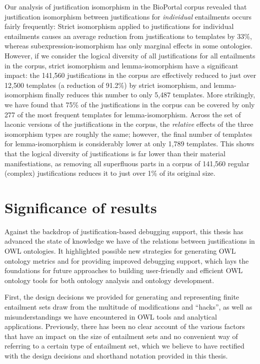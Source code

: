 Our analysis of justification isomorphism in the BioPortal corpus revealed that justification isomorphism between justifications for \emph{individual} entailments occurs fairly frequently: Strict isomorphism applied to justifications for individual entailments causes an average reduction from justifications to templates by 33\%, whereas subexpression-isomorphism has only marginal effects in some ontologies. However, if we consider the logical diversity of all justifications for all entailments in the corpus, strict isomorphism and lemma-isomorphism have a significant impact: the 141,560 justifications in the corpus are effectively reduced to just over 12,500 templates (a reduction of 91.2\%) by strict isomorphism, and lemma-isomorphism finally reduces this number to only 5,487 templates. More strikingly, we have found that 75\% of the justifications in the corpus can be covered by only 277 of the most frequent templates for lemma-isomorphism. Across the set of laconic versions of the justifications in the corpus, the \emph{relative} effects of the three isomorphism types are roughly the same; however, the final number of templates for lemma-isomorphism is considerably lower at only 1,789 templates. This shows that the logical diversity of justifications is far lower than their material manifestiations, as removing all superfluous parts in a corpus of 141,560 regular (complex) justifications reduces it to just over 1\% of its original size.



\section{Significance of results}

Against the backdrop of justification-based debugging support, this thesis has advanced the state of knowledge we have of the relations between justifications in OWL ontologies. It highlighted possible new strategies for generating OWL ontology metrics and for providing improved debugging support, which lays the foundations for future approaches to building user-friendly and efficient  OWL ontology tools for both ontology analysis and ontology development.

First, the design decisions we provided for generating and representing finite entailment sets draw from the multitude of modifications and \enquote{hacks}, as well as misunderstandings we have encountered in OWL tools and analytical applications. Previously, there has been no clear account of the various factors that have an impact on the size of entailment sets and no convenient way of referring to a certain type of entailment set, which we believe to have rectified with the design decisions and shorthand notation provided in this thesis. 


